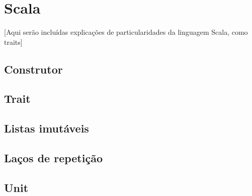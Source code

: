 \chapter{Scala}

[Aqui serão incluídas explicações de 
particularidades da linguagem Scala, 
como traits]

\section{Construtor}

\section{Trait}

\section{Listas imutáveis}

\section{Laços de repetição}

\section{Unit}

